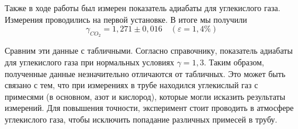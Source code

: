 \documentclass[a4paper,12pt]{article}
\theoremstyle{definition}
\begin{document}
	Также в ходе работы был измерен показатель адиабаты для углекислого газа. Измерения проводились на первой установке. В итоге мы получили \[ \boxed{\gamma_{CO_2} = 1,271 \pm 0,016}\quad (\varepsilon=1,4\%) \]
	
	Сравним эти данные с табличными. Согласно справочнику, показатель адиабаты для углекислого газа при нормальных условиях \underline{$ \gamma = 1,3 $}. Таким образом, полученные данные незначительно отличаются от табличных. Это может быть связано с тем, что при измерениях в трубе находился углекислый газ с примесями (в основном, азот и кислород), которые могли исказить результаты измерений. Для повышения точности, эксперимент стоит проводить в атмосфере углекислого газа, чтобы исключить попадание различных примесей в трубу.
	
	
	
	
	
	
\end{document}
